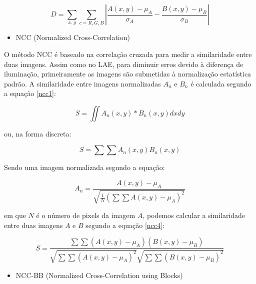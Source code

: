 \begin{equation}
D = \sum_ {x,y}^{} \sum_{c=R,G,B}^{} \left | \frac{A(x,y)-\mu _A}{\sigma _A} - \frac{B(x,y)-\mu _B}{\sigma _B} \right |
\label{lae}
\end{equation}

\begin{itemize}
\item NCC (Normalized Cross-Correlation)
\end{itemize}

O método NCC é baseado na correlação cruzada para medir a similaridade entre duas imagens. Assim como no LAE, para diminuir erros devido à diferença de iluminação, primeiramente as imagens são submetidas à normalização estatística padrão. A similaridade entre imagens normalizadas $A_n$ e $B_n$ é calculada segundo a equação \ref{ncc1}:

\begin{equation}
S = \iint A_n(x,y)*B_n(x,y) dx dy \label{ncc1} 
\end{equation}

ou, na forma discreta:

\begin{equation}
S = \sum \sum A_n(x,y)B_n(x,y) \label{ncc2} 
\end{equation} 


Sendo uma imagem normalizada segundo a equação:

\begin{equation}
A_n = \frac {A(x,y) - \mu_A}{\sqrt {\frac{1}{N}(\sum \sum {A(x,y)-\mu_A})^2}} \label{ncc3} 
\end{equation} 

em que $N$ é o número de pixels da imagem $A$, podemos calcular a similaridade entre duas imagens $A$ e $B$ segundo a equação \ref{ncc4}:

\begin{equation}
S = \frac{\sum \sum (A(x,y)-\mu _A)(B(x,y)-\mu _B)}{\sqrt{\sum \sum (A(x,y)-\mu _A)^2}\sqrt{\sum \sum (B(x,y)-\mu _B)^2}}
\label{ncc4}
\end{equation}

\begin{itemize}
\item NCC-BB (Normalized Cross-Correlation using Blocks)
\end{itemize}

